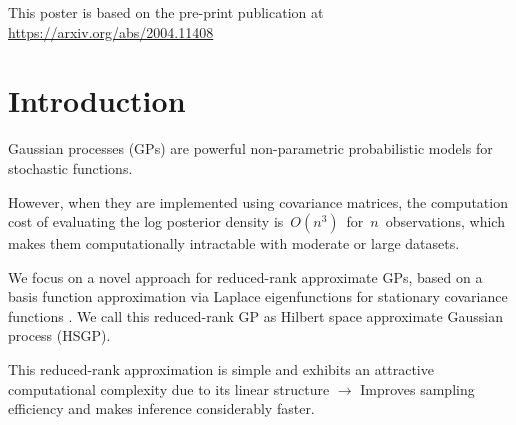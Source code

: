 \documentclass[landscape,a1,final]{a0poster} %
\let\tempone\itemize
\let\temptwo\enditemize
\renewenvironment{itemize}{\tempone\addtolength{\itemsep}{-0.3\baselineskip}}{\temptwo}
\begin{document}
\begin{minipage}{1\linewidth} 
\centering
\begin{minipage}[t]{0.31\linewidth}
\vspace{0pt}
\setlength{\parindent}{10mm} %

\vspace{-0.5cm}
This poster is based on the pre-print publication at \url{https://arxiv.org/abs/2004.11408}

\vspace{-1cm}
\section{Introduction}
\vspace{-0.2cm}

\begin{itemize}
	\setlength{\itemsep}{3mm}
	\item Gaussian processes (GPs) are powerful non-parametric probabilistic models for stochastic functions.
	\item However, when they are implemented using covariance matrices, the computation cost of evaluating the log posterior density is\, $O(n^3)$\, for\, $n$\, observations, which makes them computationally intractable with moderate or large datasets.
	\item We focus on a novel approach for reduced-rank approximate GPs, based on a basis function approximation via Laplace eigenfunctions
for stationary covariance functions {\color{darkgray} \citep{solin2018hilbert}}. We call this reduced-rank GP as {\color{navyblue} Hilbert space approximate Gaussian process} (HSGP).
	\item This reduced-rank approximation is simple and exhibits an attractive computational complexity due to its linear structure\; $\to$\; Improves sampling efficiency and makes inference considerably faster.
	


\end{itemize}
\end{minipage}
\end{minipage}
\end{document}
